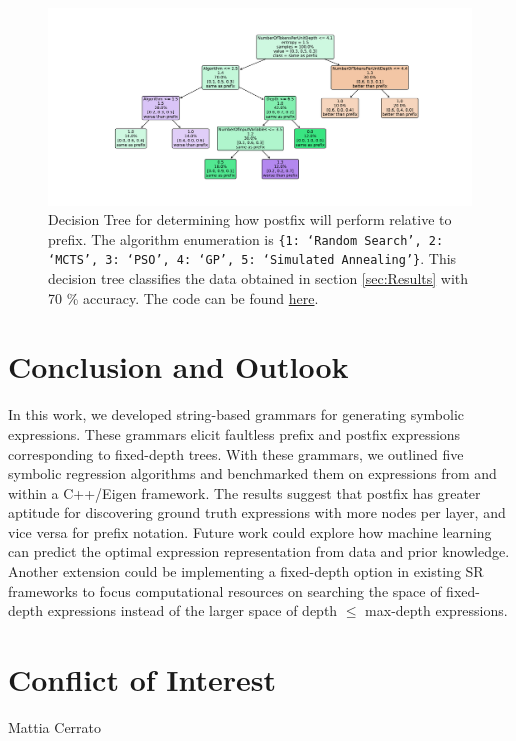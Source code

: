 \documentclass[runningheads]{llncs}
\begin{document}
\begin{figure}
    \centering
    \includegraphics[width=\linewidth]{PrefixPostfixDecisionTree.pdf}
    \caption{Decision Tree for determining how postfix will perform relative to prefix. The algorithm enumeration is \texttt{\{1: `Random Search', 2: `MCTS', 3: `PSO', 4: `GP', 5: `Simulated Annealing'\}}. This decision tree classifies the data obtained in section \ref{sec:Results} with 70 \% accuracy. The code can be found \href{https://github.com/edfink234/Alpha-Zero-Symbolic-Regression/blob/0b5b6d0b56c2d108dda023a337edeb1084436da7/PrefixPostfixDecisionTree.py}{here}. } 
    \label{fig:PrefixPostfixDecisionTree}
\end{figure}

\section{Conclusion and Outlook}
In this work, we developed string-based grammars for generating symbolic expressions. These grammars elicit faultless prefix and postfix expressions corresponding to fixed-depth trees. With these grammars, we outlined five symbolic regression algorithms and benchmarked them on expressions from \cite{hemberg2008pre} and \cite{udrescu2020ai} within a C++/Eigen framework. The results suggest that postfix has greater aptitude for discovering ground truth expressions with more nodes per layer, and vice versa for prefix notation. Future work could explore how machine learning can predict the optimal expression representation from data and prior knowledge. Another extension could be implementing a fixed-depth option in existing SR frameworks to focus computational resources on searching the space of fixed-depth expressions instead of the larger space of depth $\leq$ max-depth expressions. 

\section{Conflict of Interest}
Mattia Cerrato
\end{document}
